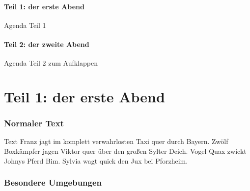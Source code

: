 	\subsection*{Teil 1: der erste Abend}

	\begin{frame}{Agenda Teil 1}
		\tableofcontents[part=1, subsectionstyle=hide]
	\end{frame}


	\subsection*{Teil 2: der zweite Abend}

	\begin{frame}{Agenda Teil 2 zum Aufklappen}
		\tableofcontents[part=2, pausesections]
	\end{frame}






	\part{Teil 1: der erste Abend}

	\frame{\partpage}

	\section{Normaler Text}

	\begin{frame}{Text}
		Franz jagt im komplett verwahrlosten Taxi quer durch Bayern.
		Zwölf Boxkämpfer jagen Viktor quer über den großen Sylter Deich.
		Vogel Quax zwickt Johnys Pferd Bim.
		Sylvia wagt quick den Jux bei Pforzheim.
	\end{frame}


	\section{Besondere Umgebungen}

